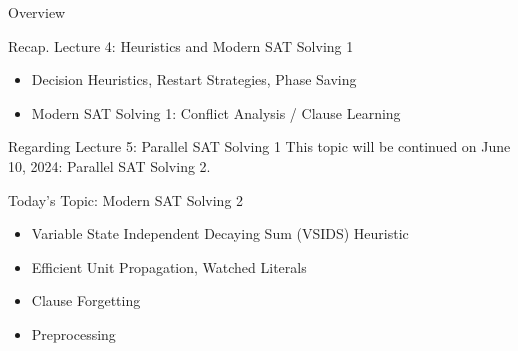 \documentclass[t]{sdqbeamer}
\begin{document}
\begin{frame}{Overview}
    \begin{block}{Recap. Lecture 4: Heuristics and Modern SAT Solving 1}
        \begin{itemize}\setlength{\itemsep}{1em}
            \item Decision Heuristics, Restart Strategies, Phase Saving
            \item Modern SAT Solving 1: Conflict Analysis / Clause Learning
        \end{itemize}
    \end{block}
    \begin{block}{Regarding Lecture 5: Parallel SAT Solving 1}
        This topic will be continued on June 10, 2024: Parallel SAT Solving 2.
    \end{block}
	\begin{block}{Today's Topic: Modern SAT Solving 2}
		\begin{itemize}\setlength{\itemsep}{1ex}
			\item Variable State Independent Decaying Sum (VSIDS) Heuristic
			\item Efficient Unit Propagation, Watched Literals
			\item Clause Forgetting
			\item Preprocessing
		\end{itemize}
	\end{block}
\end{frame}
\end{document}
